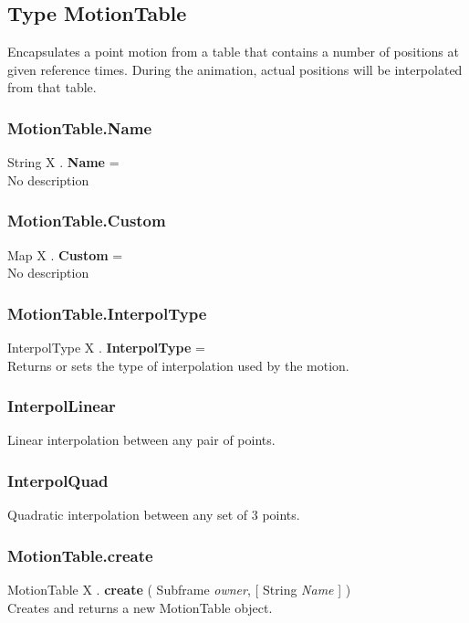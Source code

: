 \documentclass[10pt]{book}
\begin{document}
\subsection{Type MotionTable \label{T:MotionTable}}
Encapsulates a point motion from a table that contains a number of positions at given reference times. During the animation, actual positions will be interpolated from that table.

\subsubsection{MotionTable.Name \label{F:MotionTable:Name}}
String X . \textbf{Name} = \\
No description

\subsubsection{MotionTable.Custom \label{F:MotionTable:Custom}}
Map X . \textbf{Custom} = \\
No description

\subsubsection{MotionTable.InterpolType \label{F:MotionTable:InterpolType}}
InterpolType X . \textbf{InterpolType} = \\
Returns or sets the type of interpolation used by the motion.

\subsubsection{InterpolLinear \label{T:InterpolType|InterpolLinear}}
Linear interpolation between any pair of points.

\subsubsection{InterpolQuad \label{T:InterpolType|InterpolQuad}}
Quadratic interpolation between any set of 3 points.

\subsubsection{MotionTable.create \label{F:MotionTable:create}}
MotionTable X . \textbf{create} ( Subframe \textit{owner},  [ String \textit{Name} ] ) \\
Creates and returns a new MotionTable object.
\end{document}

